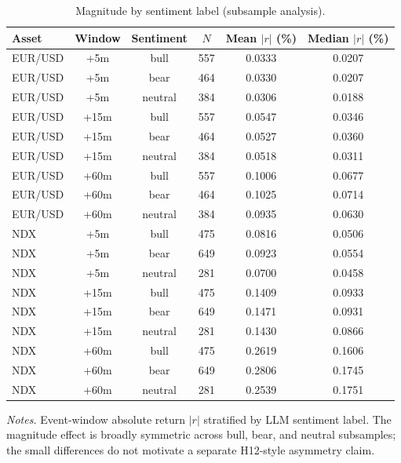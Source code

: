 \begin{table}[!htbp]
\centering
\caption{Magnitude by sentiment label (subsample analysis).}
\label{tab:subsample-magnitude}
\begin{threeparttable}
\small
\begin{tabular}{lccccc}
\toprule
Asset & Window & Sentiment & $N$ & Mean $|r|$ (\%) & Median $|r|$ (\%) \\
\midrule
EUR/USD & +5m & bull & 557 & 0.0333 & 0.0207 \\
EUR/USD & +5m & bear & 464 & 0.0330 & 0.0207 \\
EUR/USD & +5m & neutral & 384 & 0.0306 & 0.0188 \\
EUR/USD & +15m & bull & 557 & 0.0547 & 0.0346 \\
EUR/USD & +15m & bear & 464 & 0.0527 & 0.0360 \\
EUR/USD & +15m & neutral & 384 & 0.0518 & 0.0311 \\
EUR/USD & +60m & bull & 557 & 0.1006 & 0.0677 \\
EUR/USD & +60m & bear & 464 & 0.1025 & 0.0714 \\
EUR/USD & +60m & neutral & 384 & 0.0935 & 0.0630 \\
NDX & +5m & bull & 475 & 0.0816 & 0.0506 \\
NDX & +5m & bear & 649 & 0.0923 & 0.0554 \\
NDX & +5m & neutral & 281 & 0.0700 & 0.0458 \\
NDX & +15m & bull & 475 & 0.1409 & 0.0933 \\
NDX & +15m & bear & 649 & 0.1471 & 0.0931 \\
NDX & +15m & neutral & 281 & 0.1430 & 0.0866 \\
NDX & +60m & bull & 475 & 0.2619 & 0.1606 \\
NDX & +60m & bear & 649 & 0.2806 & 0.1745 \\
NDX & +60m & neutral & 281 & 0.2539 & 0.1751 \\
\bottomrule
\end{tabular}
\begin{tablenotes}
\footnotesize
\item \textit{Notes.} Event-window absolute return $|r|$ stratified
by LLM sentiment label. The magnitude effect is broadly symmetric
across bull, bear, and neutral subsamples; the small differences
do not motivate a separate H12-style asymmetry claim.
\end{tablenotes}
\end{threeparttable}
\end{table}
